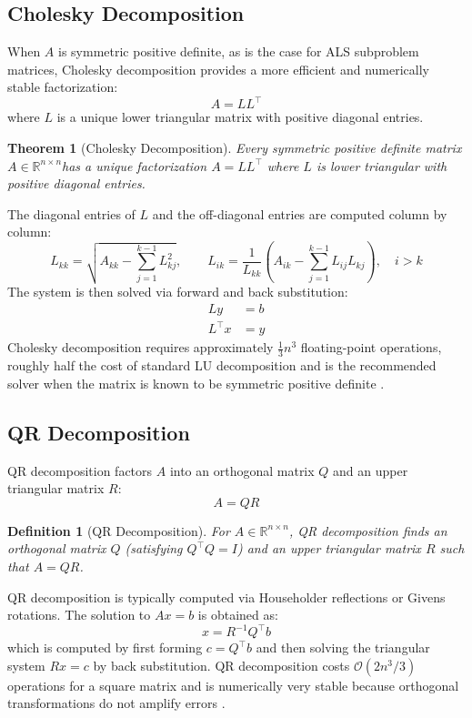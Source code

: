 \documentclass[12pt,a4paper]{report}
\newtheorem{definition}{Definition}[chapter]
\newtheorem{theorem}{Theorem}[chapter]
\begin{document}
\subsection{Cholesky Decomposition}

When \( A \) is symmetric positive definite, as is the case for ALS subproblem matrices, Cholesky decomposition provides a more efficient and numerically stable factorization:
\[
    A = LL^\top
\]
where \( L \) is a unique lower triangular matrix with positive diagonal entries.

\begin{theorem}[Cholesky Decomposition]
    Every symmetric positive definite matrix \( A \in \mathbb{R}^{n \times n} \)has a unique factorization \( A = LL^\top \) where \( L \) is lower triangular with positive diagonal entries.
\end{theorem}

The diagonal entries of \( L \) and the off-diagonal entries are computed
column by column:
\[
    L_{kk} = \sqrt{A_{kk} - \sum_{j=1}^{k-1} L_{kj}^2}, \qquad
    L_{ik} = \frac{1}{L_{kk}} \left( A_{ik} - \sum_{j=1}^{k-1} L_{ij} L_{kj}
    \right), \quad i > k
\]
The system is then solved via forward and back substitution:
\begin{align*}
    Ly  &= b \\
    L^\top x &= y
\end{align*}
Cholesky decomposition requires approximately \( \frac{1}{3} n^3 \) floating-point operations, roughly half the cost of standard LU decomposition and is the recommended solver when the matrix is known to be symmetric positive definite \parencite{axler2024linear}.

\subsection{QR Decomposition}

QR decomposition factors \( A \) into an orthogonal matrix \( Q \) and an upper triangular matrix \( R \):
\[
    A = QR
\]

\begin{definition}[QR Decomposition]
    For \( A \in \mathbb{R}^{n \times n} \), QR decomposition finds an orthogonal
    matrix \( Q \) (satisfying \( Q^\top Q = I \)) and an upper triangular matrix
    \( R \) such that \( A = QR \).
\end{definition}

QR decomposition is typically computed via Householder reflections or Givens rotations. The solution to \( Ax = b \) is obtained as:
\[
    x = R^{-1} Q^\top b
\]
which is computed by first forming \( c = Q^\top b \) and then solving the triangular system \( Rx = c \) by back substitution. QR decomposition costs \( \mathcal{O}(2n^3/3) \) operations for a square matrix and is numerically very stable because orthogonal transformations do not amplify errors \parencite{axler2024linear}.
\end{document}
